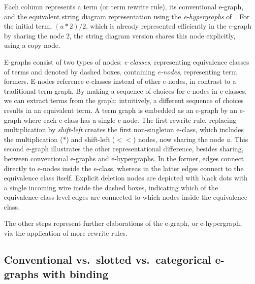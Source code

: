 Each column represents a term (or term rewrite rule), its conventional e-graph, and the equivalent string diagram representation using the \emph{e-hypergraphs} of~\citet{ghica2024equivalencehypergraphsegraphsmonoidal}.
For the initial term, $(a*2)/2$, which is already represented efficiently in the e-graph by sharing the node $2$, the string diagram version shares this node explicitly, using a copy node.

E-graphs consist of two types of nodes: \emph{e-classes}, representing equivalence classes of terms and denoted by dashed boxes, containing \emph{e-nodes}, representing term formers.
E-nodes reference e-classes instead of other e-nodes, in contrast to a traditional term graph.
By making a sequence of choices for e-nodes in e-classes, we can extract terms from the graph; intuitively, a different sequence of choices results in an equivalent term.
A term graph is embedded as an e-graph by an e-graph where each e-class has a single e-node.
The first rewrite rule, replacing multiplication by \emph{shift-left} creates the first non-singleton e-class, which includes the multiplication ($*$) and shift-left ($<\!\!<$) nodes, now sharing the node $a$.
This second e-graph illustrates the other representational difference, besides sharing, between conventional e-graphs and e-hypergraphs.
In the former, edges connect directly to e-nodes inside the e-class, whereas in the latter edges connect to the equivalence class itself.
Explicit deletion nodes are depicted with black dots with a single incoming wire
inside the dashed boxes, indicating which of the equivalence-class-level edges are connected to which nodes inside the equivalence class.

The other steps represent further elaborations of the e-graph, or e-hypergraph, via the application of more rewrite rules.

\subsection{Conventional vs.\ slotted vs.\ categorical e-graphs with binding}%
\label{sec:vs-e-graphs-with-binding}

